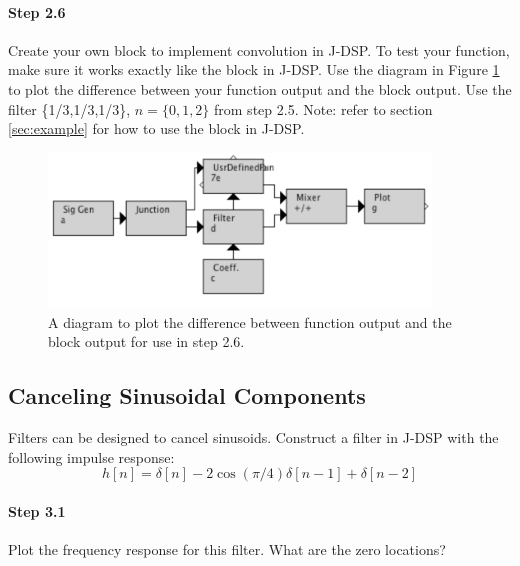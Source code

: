 	

\paragraph{Step 2.6} Create your own  block to implement convolution in J-DSP. 
	To test your function, make sure it works exactly like the  block in J-DSP.
	Use the diagram in Figure \ref{fg:userdefined} to plot the difference between your function output and the  block output.
	Use the filter \{1/3,1/3,1/3\}, $n=\{0,1,2\}$ from step 2.5.
	Note: refer to section \ref{sec:example} for how to use the  block in J-DSP.
	
	\begin{figure}[t]
	    \begin{center}	     
	        \includegraphics[width=4in]{lab6/userdefinedtest}
	        \caption{A diagram to plot the difference between 
	         function output and the  block output for use in step 2.6.}
	         \label{fg:userdefined}
	    \end{center}
	  \end{figure}
	  
	  

\subsection{Canceling Sinusoidal Components}

Filters can be designed to cancel sinusoids.  Construct a filter in
J-DSP with the following impulse response:
\begin{equation}
h[n] = \delta[n] - 2\cos(\pi/4) \delta[n-1] + \delta[n-2]
\end{equation}

\paragraph{Step 3.1} Plot the frequency response for this filter. What
	are the zero locations?


